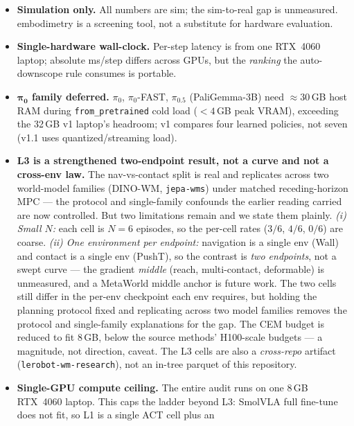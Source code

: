 \documentclass[10pt]{article}
\begin{document}
\begin{itemize}\setlength{\itemsep}{0pt}\setlength{\parskip}{0pt}\setlength{\topsep}{0pt}\setlength{\partopsep}{0pt}
    \item \textbf{Simulation only.} All numbers are sim; the sim-to-real
    gap is unmeasured. embodimetry is a screening tool, not a
    substitute for hardware evaluation.
    \item \textbf{Single-hardware wall-clock.} Per-step latency is from
    one RTX~4060 laptop; absolute ms/step differs across GPUs, but the
    \emph{ranking} the auto-downscope rule consumes is portable.
    \item \textbf{$\boldsymbol{\pi_0}$ family deferred.} $\pi_0$,
    $\pi_0$-FAST, $\pi_{0.5}$ (PaliGemma-3B) need ${\approx}30$\,GB host
    RAM during \texttt{from\_pretrained} cold load ($<4$\,GB peak VRAM),
    exceeding the 32\,GB v1 laptop's headroom; v1 compares four learned
    policies, not seven (v1.1 uses quantized/streaming load).
    \item \textbf{L3 is a strengthened two-endpoint result, not a curve and
    not a cross-env law.} The nav-vs-contact split is real and replicates
    across two world-model families (DINO-WM, \texttt{jepa-wms}) under
    matched receding-horizon MPC --- the protocol and single-family
    confounds the earlier reading carried are now controlled. But two
    limitations remain and we state them plainly. \emph{(i) Small $N$:}
    each cell is $N{=}6$ episodes, so the per-cell rates ($3/6$, $4/6$,
    $0/6$) are coarse. \emph{(ii) One environment per endpoint:} navigation
    is a single env (Wall) and contact is a single env (PushT), so the
    contrast is \emph{two endpoints}, not a swept curve --- the gradient
    \emph{middle} (reach, multi-contact, deformable) is unmeasured, and a
    MetaWorld middle anchor is future work. The two cells still differ in
    the per-env checkpoint each env requires, but holding the planning
    protocol fixed and replicating across two model families removes the
    protocol and single-family explanations for the gap. The CEM budget is
    reduced to fit 8\,GB, below the source methods' H100-scale budgets --- a
    magnitude, not direction, caveat. The L3 cells are also a
    \emph{cross-repo} artifact (\texttt{lerobot-wm-research}), not an
    in-tree parquet of this repository.
    \item \textbf{Single-GPU compute ceiling.} The entire audit runs on
    one 8\,GB RTX~4060 laptop. This caps the ladder beyond L3: SmolVLA
    full fine-tune does not fit, so L1 is a single ACT cell plus an

\end{itemize}
\end{document}
